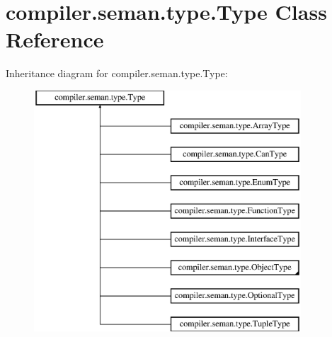 \hypertarget{classcompiler_1_1seman_1_1type_1_1_type}{}\section{compiler.\+seman.\+type.\+Type Class Reference}
\label{classcompiler_1_1seman_1_1type_1_1_type}
Inheritance diagram for compiler.\+seman.\+type.\+Type\+:\begin{figure}[H]
\begin{center}
\leavevmode
\includegraphics[height=9.000000cm]{classcompiler_1_1seman_1_1type_1_1_type}
\end{center}
\end{figure}
